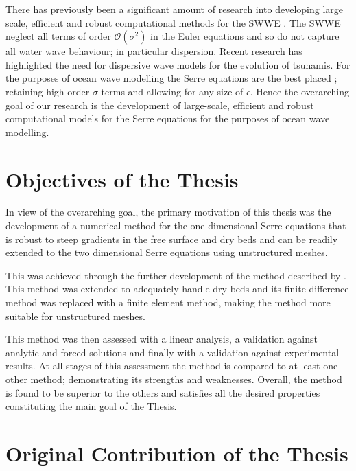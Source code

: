 There has previously been a significant amount of research into developing large scale, efficient and robust computational methods for the SWWE \cite{ClawPack,Comcot,ANUGA}. The SWWE neglect all terms of order $\mathcal{O}\left(\sigma ^2\right)$ in the Euler equations and so do not capture all water wave behaviour; in particular dispersion. Recent research \cite{Grue-etal-2008-113,Kirby-etal-2013-39} has highlighted the need for dispersive wave models for the evolution of tsunamis. For the purposes of ocean wave modelling the Serre equations are the best placed \cite{Bonneton-Lannes-2009-16601}; retaining high-order $\sigma$ terms and allowing for any size of $\epsilon$. Hence the overarching goal of our research is the development of large-scale, efficient and robust computational models for the Serre equations for the purposes of ocean wave modelling.

\section{Objectives of the Thesis}
%
%


In view of the overarching goal, the primary motivation of this thesis was the development of a numerical method for the one-dimensional Serre equations that is robust to steep gradients in the free surface and dry beds and can be readily extended to the two dimensional Serre equations using unstructured meshes. 

This was achieved through the further development of the method described by \citet{Zoppou-2014}. This method was extended to adequately handle dry beds and its finite difference method was replaced with a finite element method, making the method more suitable for unstructured meshes. 

This method was then assessed with a linear analysis, a validation against analytic and forced solutions and finally with a validation against experimental results. At all stages of this assessment the method is compared to at least one other method; demonstrating its strengths and weaknesses. Overall, the method is found to be superior to the others and satisfies all the desired properties constituting the main goal of the Thesis.

\section{Original Contribution of the Thesis}

